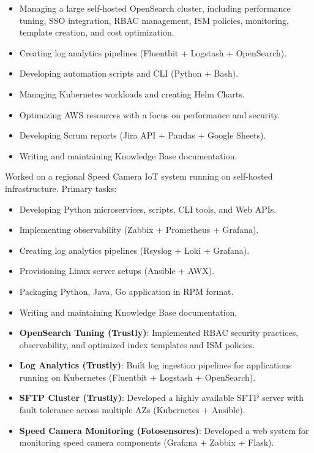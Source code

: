 \documentclass[10pt,a4paper]{altacv}
\begin{document}
\bigskip

\begin{itemize}
    \item Managing a large self-hosted OpenSearch cluster, including performance tuning, SSO integration, RBAC management, ISM policies, monitoring, template creation, and cost optimization.
    \item Creating log analytics pipelines (Fluentbit + Logstash + OpenSearch).
    \item Developing automation scripts and CLI (Python + Bash).
    \item Managing Kubernetes workloads and creating Helm Charts.
    \item Optimizing AWS resources with a focus on performance and security.
    \item Developing Scrum reports (Jira API + Pandas +  Google Sheets).
    \item Writing and maintaining Knowledge Base documentation.
\end{itemize}

\divider


Worked on a regional Speed Camera IoT system running on self-hosted infrastructure. Primary tasks:

\bigskip

\begin{itemize}
    \item Developing Python microservices, scripts, CLI tools, and Web APIs.
    \item Implementing observability (Zabbix + Prometheus + Grafana).
    \item Creating log analytics pipelines (Rsyslog + Loki + Grafana).
    \item Provisioning Linux server setups (Ansible + AWX).  
    \item Packaging Python, Java, Go application in RPM format.
    \item Writing and maintaining Knowledge Base documentation.  
\end{itemize}

\bigskip
\bigskip


\begin{itemize}
    \item \textbf{OpenSearch Tuning (Trustly)}: Implemented RBAC security practices, observability, and optimized index templates and ISM policies.
    \item \textbf{Log Analytics (Trustly)}: Built log ingestion pipelines for applications running on Kubernetes (Fluentbit + Logstash + OpenSearch).
    \item \textbf{SFTP Cluster (Trustly)}: Developed a highly available SFTP server with fault tolerance across multiple AZs (Kubernetes + Ansible).
    \item \textbf{Speed Camera Monitoring (Fotosensores)}: Developed a web system for monitoring speed camera components (Grafana + Zabbix + Flask).
\end{itemize}


\clearpage
\end{document}
